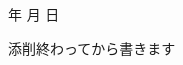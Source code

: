 \newpage
\changeindent{0cm}
\acknowledgements
\changeindent{2cm}

\begin{flushright}
  年  月  日
\end{flushright}

添削終わってから書きます
